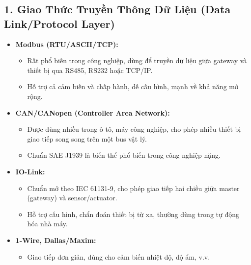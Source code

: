 \begin{itemize}
\begin{itemize}
        \subsection*{1. Giao Thức Truyền Thông Dữ Liệu (Data Link/Protocol Layer)}
        \begin{itemize}
            \item \textbf{Modbus (RTU/ASCII/TCP):}
            \begin{itemize}
                \item Rất phổ biến trong công nghiệp, dùng để truyền dữ liệu giữa gateway và thiết bị qua RS485, RS232 hoặc TCP/IP.
                \item Hỗ trợ cả cảm biến và chấp hành, dễ cấu hình, mạnh về khả năng mở rộng.
            \end{itemize}
            \item \textbf{CAN/CANopen (Controller Area Network):}
            \begin{itemize}
                \item Được dùng nhiều trong ô tô, máy công nghiệp, cho phép nhiều thiết bị giao tiếp song song trên một bus vật lý.
                \item Chuẩn SAE J1939 là biến thể phổ biến trong công nghiệp nặng.
            \end{itemize}
            \item \textbf{IO-Link:}
            \begin{itemize}
                \item Chuẩn mở theo IEC 61131-9, cho phép giao tiếp hai chiều giữa master (gateway) và sensor/actuator.
                \item Hỗ trợ cấu hình, chẩn đoán thiết bị từ xa, thường dùng trong tự động hóa nhà máy.
            \end{itemize}
            \item \textbf{1-Wire, Dallas/Maxim:}
            \begin{itemize}
                \item Giao tiếp đơn giản, dùng cho cảm biến nhiệt độ, độ ẩm, v.v.
            \end{itemize}
        \end{itemize}

\end{itemize}
\end{itemize}
